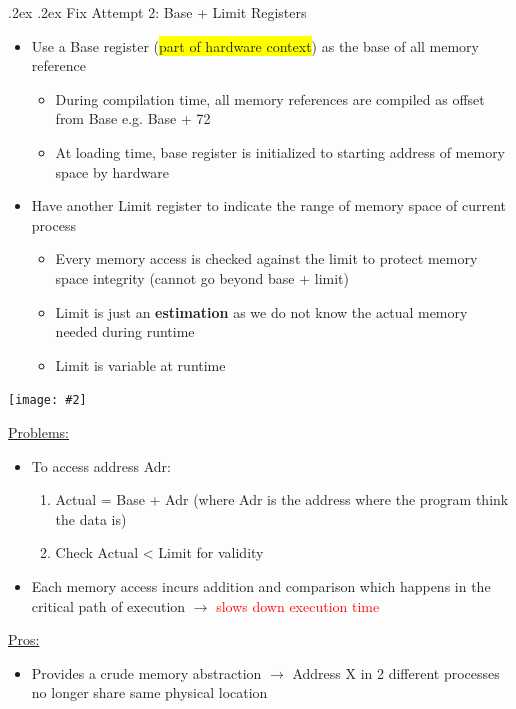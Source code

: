 \documentclass[13pt,landscape,a4paper]{article}
\makeatletter
\newcommand\ctrimg[2][0.8]{\begin{center}\texttt{[image: \#2]} \end{center}}
\newcommand\red[1]{\textcolor{red}{#1}}
\renewcommand{\subsubsection}{\@startsection{subsubsection}{1}{0mm}%
    {.2ex}%
    {.2ex}%
    {\rmfamily\bfseries}}
\makeatother
\begin{document}
\begin{multicols*}{3}
        \subsubsection{Fix Attempt 2: Base + Limit Registers}
        \begin{itemize}
            \item Use a Base register (\colorbox{yellow}{part of hardware context}) as the base of all memory reference
            \begin{itemize}
                \item During compilation time, all memory references are compiled as offset from Base
                e.g. Base + 72
                \item At loading time, base register is initialized to starting address of memory space by hardware
            \end{itemize}
            \item Have another Limit register to indicate the range of memory space of current process
            \begin{itemize}
                \item Every memory access is checked against the limit to protect memory space integrity (cannot go beyond base + limit)
                \item Limit is just an \textbf{estimation} as we do not know the actual memory needed during runtime
                \item Limit is variable at runtime
            \end{itemize}
        \end{itemize}
        \ctrimg[0.6]{base\_plus\_limit}
        \underline{Problems: }
        \begin{itemize}
            \item To access address Adr:
            \begin{enumerate}
                \item Actual = Base + Adr (where Adr is the address where the program think the data is)
                \item Check Actual < Limit for validity
            \end{enumerate}
            \item Each memory access incurs addition and comparison which happens in the critical path of execution $\rightarrow$ \red{slows down execution time}
        \end{itemize}
        \underline{Pros:}
        \begin{itemize}
            \item Provides a crude memory abstraction $\rightarrow$ Address X in 2 different processes no longer share same physical location
        \end{itemize}
        \columnbreak

\end{multicols*}
\end{document}

